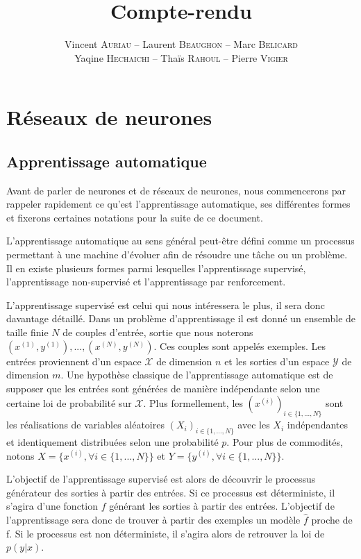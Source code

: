 \documentclass{report}
\title{Compte-rendu}
\author{Vincent \textsc{Auriau} -- Laurent \textsc{Beaughon} -- Marc \textsc{Belicard} \\ Yaqine \textsc{Hechaichi} -- Thaïs \textsc{Rahoul} -- Pierre \textsc{Vigier}}
\begin{document}
\maketitle

\tableofcontents

\chapter{Réseaux de neurones}

\section{Apprentissage automatique}

Avant de parler de neurones et de réseaux de neurones, nous commencerons par rappeler rapidement ce qu'est l'apprentissage automatique, ses différentes formes et fixerons certaines notations pour la suite de ce document.

L'apprentissage automatique au sens général peut-être défini comme un processus permettant à une machine d'évoluer afin de résoudre une tâche ou un problème. Il en existe plusieurs formes parmi lesquelles l'apprentissage supervisé, l'apprentissage non-supervisé et l'apprentissage par renforcement.

L'apprentissage supervisé est celui qui nous intéressera le plus, il sera donc davantage détaillé. Dans un problème d'apprentissage il est donné un ensemble de taille finie $N$ de couples d'entrée, sortie que nous noterons $(x^{(1)},y^{(1)}), ..., (x^{(N)}, y^{(N)})$. Ces couples sont appelés exemples. Les entrées proviennent d'un espace $\mathcal{X}$ de dimension $n$ et les sorties d'un espace $\mathcal{Y}$ de dimension $m$. Une hypothèse classique de l'apprentissage automatique est de supposer que les entrées sont générées de manière indépendante selon une certaine loi de probabilité sur $\mathcal{X}$. Plus formellement, les $(x^{(i)})_{i \in \{1, ..., N\}}$ sont les réalisations de variables aléatoires $(X_i)_{i \in \{1, ..., N\}}$ avec les $X_i$ indépendantes et identiquement distribuées selon une probabilité $p$. Pour plus de commodités, notons $X = \{x^{(i)}, \forall i \in \{1, ..., N\}\}$ et $Y = \{y^{(i)}, \forall i \in \{1, ..., N\}\}$.

L'objectif de l'apprentissage supervisé est alors de découvrir le processus générateur des sorties à partir des entrées. Si ce processus est déterministe, il s'agira d'une fonction $f$ générant les sorties à partir des entrées. L'objectif de l'apprentissage sera donc de trouver à partir des exemples un modèle $\hat{f}$ proche de f. Si le processus est non déterministe, il s'agira alors de retrouver la loi de $p(y|x)$.
\end{document}
